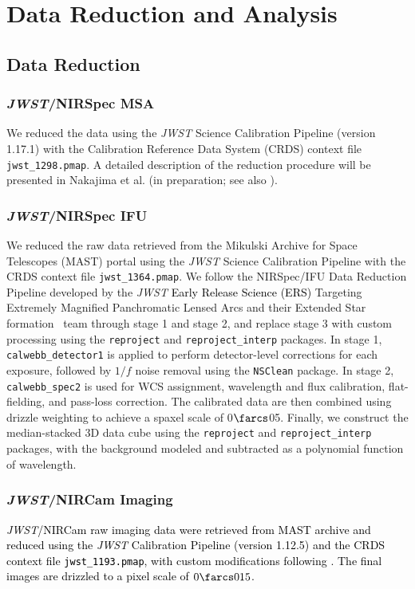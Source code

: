 \documentclass[trackchanges,twocolumn]{aastex701}
\newcommand{\ca}[1]{\textcolor{black}{#1}} %
\newcommand{\ci}[1]{\textcolor{black}{#1}}
\newcommand{\cl}[1]{\textcolor{black}{#1}}
\begin{document}
\section{Data Reduction and Analysis}
\label{sec:3}
\subsection{Data Reduction}
\subsubsection{\textit{JWST}/NIRSpec MSA}
We reduced the data using the \textit{JWST} Science Calibration Pipeline (version 1.17.1) with the Calibration Reference Data System (CRDS) context file \texttt{jwst\_1298.pmap}. A detailed description of the reduction procedure will be presented in Nakajima et al. (in preparation; see also \citealt{Nakajima2025}).

\subsubsection{\textit{JWST}/NIRSpec IFU}
We reduced the raw data retrieved from the Mikulski Archive for Space Telescopes (MAST) portal using the \textit{JWST} Science Calibration Pipeline with the CRDS context file \texttt{jwst\_1364.pmap}. We follow the NIRSpec/IFU Data Reduction Pipeline developed by the \textit{JWST} \cl{Early Release Science (ERS)} Targeting Extremely Magnified Panchromatic Lensed Arcs and their Extended Star formation~\ca{\citep[TEMPLATES;][]{Rigby2025}} team through stage 1 and stage 2, and replace stage 3 with custom processing using the \texttt{reproject} and \texttt{reproject\_interp} packages. In stage 1, \texttt{calwebb\_detector1} is applied to perform detector-level corrections for each exposure, followed by $1/f$ noise removal using the \texttt{NSClean} package. In stage 2, \texttt{calwebb\_spec2} is used for WCS assignment, wavelength and flux calibration, flat-fielding, and pass-loss correction. The calibrated data are then combined using drizzle weighting to achieve a spaxel scale of 0$\farcs$05. Finally, we construct the median-stacked 3D data cube using the \texttt{reproject} and \texttt{reproject\_interp} packages, with the background modeled and subtracted as a polynomial function of wavelength. 

\subsubsection{\textit{JWST}/NIRCam Imaging}
\ci{\textit{JWST}/NIRCam raw imaging data were retrieved from MAST archive and reduced using the \textit{JWST} Calibration Pipeline (version 1.12.5) and the CRDS context file \texttt{jwst\_1193.pmap}, with custom modifications following \citet{Harikane2023a}. The final images are drizzled to a pixel scale of $0\farcs015$.}
\end{document}
